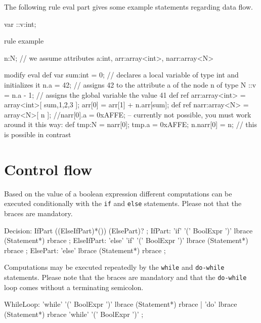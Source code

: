 \begin{example}
The following rule eval part gives some example statements regarding data flow.
  \begin{grgen}
var ::v:int;
	
rule example
{
  n:N; // we assume attributes a:int, arr:array<int>, narr:array<N>
	
	modify {
		eval {
			def var sum:int = 0; // declares a local variable of type int and initializes it
			n.a = 42; // assigns 42 to the attribute a of the node n of type N
			::v = n.a - 1; // assigns the global variable the value 41
			def ref arr:array<int> = array<int>[ sum,1,2,3 ];
			arr[0] = arr[1] + n.arr[sum];
			def ref narr:array<N> = array<N>[ n ];
			//narr[0].a = 0xAFFE; -- currently not possible, you must work around it this way:
			def tmp:N = narr[0];
			tmp.a = 0xAFFE;
			n.narr[0] = n; // this is possible in contrast
		}
	}
}
  \end{grgen}
\end{example}


\section{Control flow} \label{sub:controlflow}

Based on the value of a boolean expression different computations can be executed conditionally with the \texttt{if} and \texttt{else} statements. Please not that the braces are mandatory.

\begin{rail} 
  Decision: IfPart ((ElseIfPart)*()) (ElsePart)? ;
	IfPart: 'if' '(' BoolExpr ')' lbrace (Statement*) rbrace ;
	ElseIfPart: 'else' 'if' '(' BoolExpr ')' lbrace (Statement*) rbrace ;
	ElsePart: 'else' lbrace (Statement*) rbrace ;
\end{rail}

Computations may be executed repeatedly by the \texttt{while} and \texttt{do-while} statements. Please note that the braces are mandatory and that the \texttt{do-while} loop comes without a terminating semicolon.

\begin{rail} 
  WhileLoop: 
	'while' '(' BoolExpr ')' lbrace (Statement*) rbrace |
	'do' lbrace (Statement*) rbrace 'while' '(' BoolExpr ')' 
	;
\end{rail}

